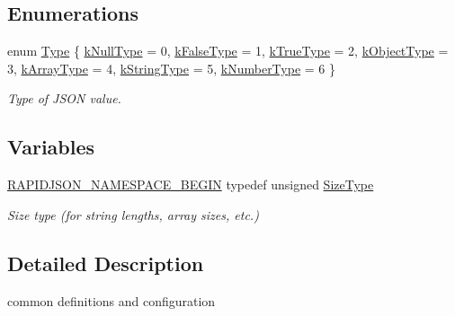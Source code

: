 \subsection*{Enumerations}
\begin{DoxyCompactItemize}
\item 
enum \hyperlink{a00560_a1d1cfd8ffb84e947f82999c682b666a7}{Type} \{ \newline
\hyperlink{a00560_a1d1cfd8ffb84e947f82999c682b666a7aa09befbfb4f2e1409f237817979d8087}{k\+Null\+Type} = 0, 
\hyperlink{a00560_a1d1cfd8ffb84e947f82999c682b666a7a062b8296274a258acf0e142868684c54}{k\+False\+Type} = 1, 
\hyperlink{a00560_a1d1cfd8ffb84e947f82999c682b666a7a209434e5edd66630011ca19d710d7cd6}{k\+True\+Type} = 2, 
\hyperlink{a00560_a1d1cfd8ffb84e947f82999c682b666a7a146f46700e905e8df96a6a90b5c7640f}{k\+Object\+Type} = 3, 
\newline
\hyperlink{a00560_a1d1cfd8ffb84e947f82999c682b666a7af41527d6925efa3c5c3dadb23dfef7c8}{k\+Array\+Type} = 4, 
\hyperlink{a00560_a1d1cfd8ffb84e947f82999c682b666a7a2d823b89b055bc743d05c03183d3f338}{k\+String\+Type} = 5, 
\hyperlink{a00560_a1d1cfd8ffb84e947f82999c682b666a7afc9f813b7aaf71911bdae20a86b2702d}{k\+Number\+Type} = 6
 \}\begin{DoxyCompactList}\small\item\em Type of J\+S\+ON value. \end{DoxyCompactList}
\end{DoxyCompactItemize}
\subsection*{Variables}
\begin{DoxyCompactItemize}
\item 
\hyperlink{a00636_gad3806c8251fdc7da9618b7e922674ffc}{R\+A\+P\+I\+D\+J\+S\+O\+N\+\_\+\+N\+A\+M\+E\+S\+P\+A\+C\+E\+\_\+\+B\+E\+G\+IN} typedef unsigned \hyperlink{a00560_a5ed6e6e67250fadbd041127e6386dcb5}{Size\+Type}
\begin{DoxyCompactList}\small\item\em Size type (for string lengths, array sizes, etc.) \end{DoxyCompactList}\end{DoxyCompactItemize}


\subsection{Detailed Description}
common definitions and configuration 


